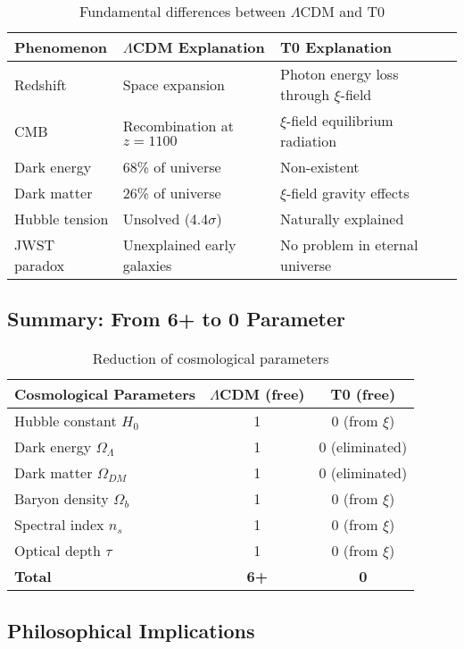 \documentclass[12pt,a4paper]{article}
\begin{document}
\begin{table}[h]
	\centering
	\begin{tabular}{p{4cm}p{5cm}p{5cm}}
		\toprule
		\textbf{Phenomenon} & \textbf{$\Lambda$CDM Explanation} & \textbf{T0 Explanation} \\
		\midrule
		Redshift & Space expansion & Photon energy loss through $\xi$-field \\
		CMB & Recombination at $z=1100$ & $\xi$-field equilibrium radiation \\
		Dark energy & 68\% of universe & Non-existent \\
		Dark matter & 26\% of universe & $\xi$-field gravity effects \\
		Hubble tension & Unsolved (4.4$\sigma$) & Naturally explained \\
		JWST paradox & Unexplained early galaxies & No problem in eternal universe \\
		\bottomrule
	\end{tabular}
	\caption{Fundamental differences between $\Lambda$CDM and T0}
\end{table}


\subsection{Summary: From 6+ to 0 Parameter}
\label{subsec:cosmic_summary}

\begin{table}[h]
	\centering
	\begin{tabular}{lcc}
		\toprule
		\textbf{Cosmological Parameters} & \textbf{$\Lambda$CDM (free)} & \textbf{T0 (free)} \\
		\midrule
		Hubble constant $H_0$ & 1 & 0 (from $\xi$) \\
		Dark energy $\Omega_{\Lambda}$ & 1 & 0 (eliminated) \\
		Dark matter $\Omega_{DM}$ & 1 & 0 (eliminated) \\
		Baryon density $\Omega_b$ & 1 & 0 (from $\xi$) \\
		Spectral index $n_s$ & 1 & 0 (from $\xi$) \\
		Optical depth $\tau$ & 1 & 0 (from $\xi$) \\
		\midrule
		\textbf{Total} & \textbf{6+} & \textbf{0} \\
		\bottomrule
	\end{tabular}
	\caption{Reduction of cosmological parameters}
\end{table}


\subsection{Philosophical Implications}
\label{subsec:philosophical_implications}
\end{document}
